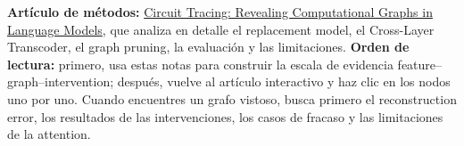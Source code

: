 \noindent\textbf{Artículo de métodos: }\href{https://transformer-circuits.pub/2025/attribution-graphs/methods.html}{Circuit Tracing: Revealing Computational Graphs in Language Models}, que analiza en detalle el replacement model, el Cross-Layer Transcoder, el graph pruning, la evaluación y las limitaciones. \textbf{Orden de lectura: }primero, usa estas notas para construir la escala de evidencia feature--graph--intervention; después, vuelve al artículo interactivo y haz clic en los nodos uno por uno. Cuando encuentres un grafo vistoso, busca primero el reconstruction error, los resultados de las intervenciones, los casos de fracaso y las limitaciones de la attention.
\normalsize



